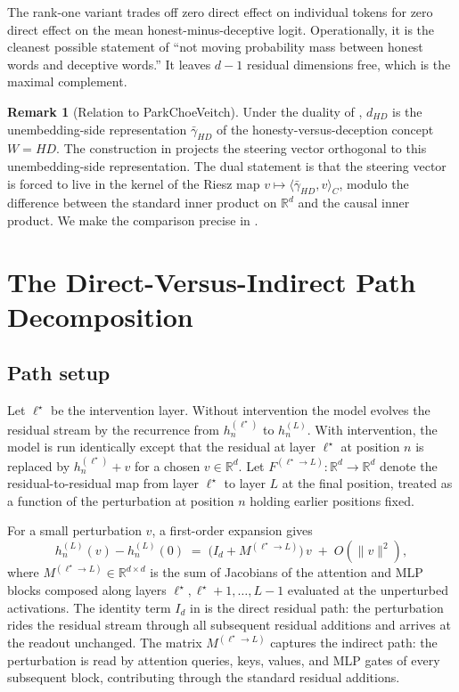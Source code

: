 \documentclass[11pt,letterpaper]{article}
\theoremstyle{plain}
\theoremstyle{definition}
\newtheorem{remark}[theorem]{Remark}
\newcommand{\R}{\mathbb{R}}
\newcommand{\1}{\mathbf{1}}
\newcommand{\hres}{h}
\begin{document}
The rank-one variant trades off zero direct effect on individual tokens for zero direct effect on the mean honest-minus-deceptive logit. Operationally, it is the cleanest possible statement of ``not moving probability mass between honest words and deceptive words.'' It leaves $d-1$ residual dimensions free, which is the maximal complement.

\begin{remark}[Relation to Park\textendash Choe\textendash Veitch]
Under the duality of \cite{park2024linear}, $d_{HD}$ is the unembedding-side representation $\bar{\gamma}_{HD}$ of the honesty-versus-deception concept $W = HD$. The construction in  projects the steering vector orthogonal to this unembedding-side representation. The dual statement is that the steering vector is forced to live in the kernel of the Riesz map $v \mapsto \langle \bar{\gamma}_{HD}, v\rangle_C$, modulo the difference between the standard inner product on $\R^d$ and the causal inner product. We make the comparison precise in .
\end{remark}

\section{The Direct-Versus-Indirect Path Decomposition}\label{sec:decomposition}

\subsection{Path setup}

Let $\ell^\star$ be the intervention layer. Without intervention the model evolves the residual stream by the recurrence  from $\hres^{(\ell^\star)}_n$ to $\hres^{(L)}_n$. With intervention, the model is run identically except that the residual at layer $\ell^\star$ at position $n$ is replaced by $\hres^{(\ell^\star)}_n + v$ for a chosen $v \in \R^d$. Let $F^{(\ell^\star \to L)} : \R^d \to \R^d$ denote the residual-to-residual map from layer $\ell^\star$ to layer $L$ at the final position, treated as a function of the perturbation at position $n$ holding earlier positions fixed.

For a small perturbation $v$, a first-order expansion gives
\begin{equation}
\hres^{(L)}_n(v) - \hres^{(L)}_n(0) \;=\; \big(I_d + M^{(\ell^\star \to L)}\big)\, v \;+\; O(\|v\|^2),
\label{eq:propagation}
\end{equation}
where $M^{(\ell^\star \to L)} \in \R^{d \times d}$ is the sum of Jacobians of the attention and MLP blocks composed along layers $\ell^\star, \ell^\star+1, \dots, L-1$ evaluated at the unperturbed activations. The identity term $I_d$ in  is the direct residual path: the perturbation rides the residual stream through all subsequent residual additions and arrives at the readout unchanged. The matrix $M^{(\ell^\star \to L)}$ captures the indirect path: the perturbation is read by attention queries, keys, values, and MLP gates of every subsequent block, contributing through the standard residual additions.
\end{document}
